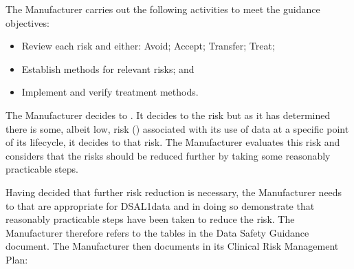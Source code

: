 \begin{minipage}[t]{0.73\textwidth}
  The Manufacturer carries out the following activities to meet the guidance objectives:
  \begin{itemize}
    \item Review each risk and either: Avoid; Accept; Transfer; Treat;
    \item Establish  methods for relevant risks; and
    \item Implement and verify treatment methods.
  \end{itemize}
\end{minipage}
\begin{minipage}[t]{0.25\textwidth}
  \centering{}
\end{minipage}

The Manufacturer decides to . It decides to  the  risk but as it has determined there is some, albeit low, risk () associated with its use of data at a specific point of its lifecycle, it decides to  that risk. The Manufacturer evaluates this risk and considers that the risks should be reduced further by taking some reasonably practicable steps.

Having decided that further risk reduction is necessary, the Manufacturer needs to  that are appropriate for DSAL1data and in doing so demonstrate that reasonably practicable steps have been taken to reduce the risk. The Manufacturer therefore refers to the tables in the Data Safety Guidance document. The Manufacturer then documents in its Clinical Risk Management Plan:

